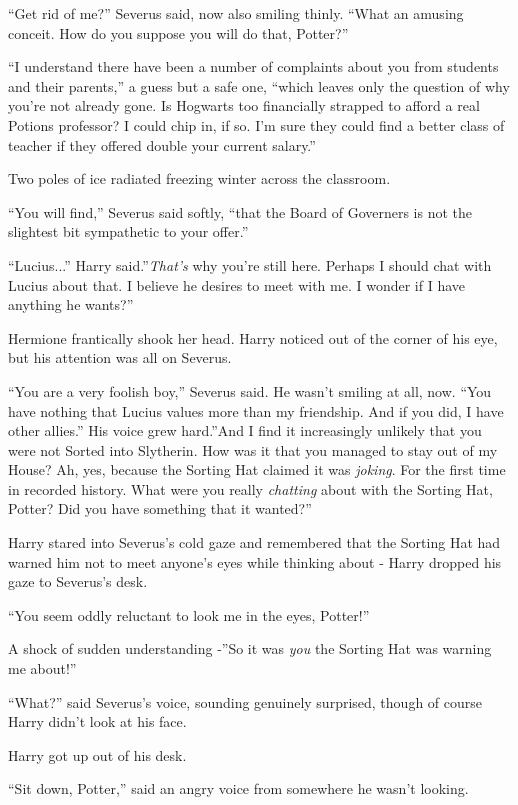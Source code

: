 ``Get rid of me?'' Severus said, now also smiling thinly. ``What an
amusing conceit. How do you suppose you will do that, Potter?''

``I understand there have been a number of complaints about you from
students and their parents,'' a guess but a safe one, ``which leaves
only the question of why you're not already gone. Is Hogwarts too
financially strapped to afford a real Potions professor? I could chip
in, if so. I'm sure they could find a better class of teacher if they
offered double your current salary.''

Two poles of ice radiated freezing winter across the classroom.

``You will find,'' Severus said softly, ``that the Board of Governers is
not the slightest bit sympathetic to your offer.''

``Lucius...'' Harry said.''\emph{That's} why you're still here.
Perhaps I should chat with Lucius about that. I believe he desires to
meet with me. I wonder if I have anything he wants?''

Hermione frantically shook her head. Harry noticed out of the corner of
his eye, but his attention was all on Severus.

``You are a very foolish boy,'' Severus said. He wasn't smiling at all,
now. ``You have nothing that Lucius values more than my friendship. And
if you did, I have other allies.'' His voice grew hard.''And I find it
increasingly unlikely that you were not Sorted into Slytherin. How was
it that you managed to stay out of my House? Ah, yes, because the
Sorting Hat claimed it was \emph{joking}. For the first time in recorded
history. What were you really \emph{chatting} about with the Sorting
Hat, Potter? Did you have something that it wanted?''

Harry stared into Severus's cold gaze and remembered that the Sorting
Hat had warned him not to meet anyone's eyes while thinking about -
Harry dropped his gaze to Severus's desk.

``You seem oddly reluctant to look me in the eyes, Potter!''

A shock of sudden understanding -''So it was \emph{you} the Sorting Hat
was warning me about!''

``What?'' said Severus's voice, sounding genuinely surprised, though of
course Harry didn't look at his face.

Harry got up out of his desk.

``Sit down, Potter,'' said an angry voice from somewhere he wasn't
looking.

